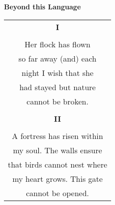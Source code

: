 \documentclass{article}
\begin{document}
\begin{center}
\textbf{Beyond this Language} \\
\vspace*{2ex}
\begin{tabular}{c}
\textbf{I} \\
\\
Her flock has flown \\
so far away (and) each \\
night I wish that she \\
had stayed but nature \\
cannot be broken. \\
\\
\textbf{II} \\
\\
A fortress has risen within \\
my soul.  The walls ensure \\
that birds cannot nest where \\
my heart grows.  This gate \\
cannot be opened. \\
\end{tabular}
\end{center}
\end{document}

